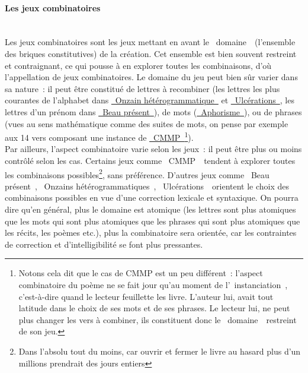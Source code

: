 \documentclass{article}
\newcommand{\subsubsubsection}[1]{\paragraph{#1}\mbox{}\\}
\begin{document}
				\subsubsubsection{Les jeux combinatoires}
					Les jeux combinatoires sont les jeux mettant en avant le \guillemotleft~domaine~\guillemotright~(l'ensemble des briques constitutives) de la création. Cet ensemble est bien souvent restreint et contraignant, ce qui pousse à en explorer toutes les combinaisons, d'où l'appellation de jeux combinatoires. Le domaine du jeu peut bien sûr varier dans sa nature~: il peut être constitué de lettres à recombiner (les lettres les plus courantes de l'alphabet dans \href{http://oulipo.net/fr/contraintes/onzain-heterogrammatique}{\guillemotleft~Onzain hétérogrammatique~\guillemotright} et \href{http://oulipo.net/fr/contraintes/ulcerations}{\guillemotleft~Ulcérations~\guillemotright}, les lettres d'un prénom dans \href{http://oulipo.net/fr/contraintes/beau-present}{\guillemotleft~Beau présent~\guillemotright}), de mots (\href{http://oulipo.net/fr/contraintes/aphorisme}{\guillemotleft~Aphorisme~\guillemotright}), ou de phrases (vues au sens mathématique comme des suites de mots, on pense par exemple aux 14 vers composant une instance de \href{http://oulipo.net/fr/contraintes/cmmp}{\guillemotleft~CMMP~\guillemotright}\footnote{Notons cela dit que le cas de CMMP est un peu différent~: l'aspect combinatoire du poème ne se fait jour qu'au moment de l'\guillemotleft~instanciation~\guillemotright, c'est-à-dire quand le lecteur feuillette les livre. L'auteur lui, avait tout latitude dans le choix de ses mots et de ses phrases. Le lecteur lui, ne peut plus changer les vers à combiner, ils constituent donc le \guillemotleft~domaine~\guillemotright~restreint de son jeu.}).\\
				
					Par ailleurs, l'aspect combinatoire varie selon les jeux~: il peut être plus ou moins contrôlé selon les cas. Certains jeux comme \guillemotleft~CMMP~\guillemotright~tendent à explorer toutes les combinaisons possibles\footnote{Dans l'absolu tout du moins, car ouvrir et fermer le livre au hasard plus d'un millions prendrait des jours entiers}, sans préférence. D'autres jeux comme \guillemotleft~Beau présent~\guillemotright, \guillemotleft~Onzains hétérogrammatiques~\guillemotright, \guillemotleft~Ulcérations~\guillemotright~orientent le choix des combinaisons possibles en vue d'une correction lexicale et syntaxique. On pourra dire qu'en général, plus le domaine est atomique (les lettres sont plus atomiques que les mots qui sont plus atomiques que les phrases qui sont plus atomiques que les récits, les poèmes etc.), plus la combinatoire sera orientée, car les contraintes de correction et d'intelligibilité se font plus pressantes.
				
\end{document}
